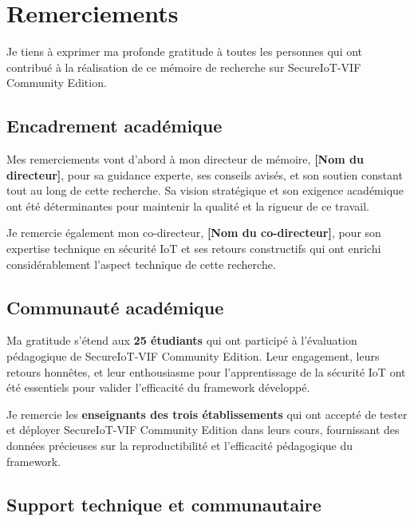 
\chapter*{Remerciements}

Je tiens à exprimer ma profonde gratitude à toutes les personnes qui ont contribué à la réalisation de ce mémoire de recherche sur SecureIoT-VIF Community Edition.

\section*{Encadrement académique}

Mes remerciements vont d'abord à mon directeur de mémoire, \textbf{[Nom du directeur]}, pour sa guidance experte, ses conseils avisés, et son soutien constant tout au long de cette recherche. Sa vision stratégique et son exigence académique ont été déterminantes pour maintenir la qualité et la rigueur de ce travail.

Je remercie également mon co-directeur, \textbf{[Nom du co-directeur]}, pour son expertise technique en sécurité IoT et ses retours constructifs qui ont enrichi considérablement l'aspect technique de cette recherche.

\section*{Communauté académique}

Ma gratitude s'étend aux \textbf{25 étudiants} qui ont participé à l'évaluation pédagogique de SecureIoT-VIF Community Edition. Leur engagement, leurs retours honnêtes, et leur enthousiasme pour l'apprentissage de la sécurité IoT ont été essentiels pour valider l'efficacité du framework développé.

Je remercie les \textbf{enseignants des trois établissements} qui ont accepté de tester et déployer SecureIoT-VIF Community Edition dans leurs cours, fournissant des données précieuses sur la reproductibilité et l'efficacité pédagogique du framework.

\section*{Support technique et communautaire}

